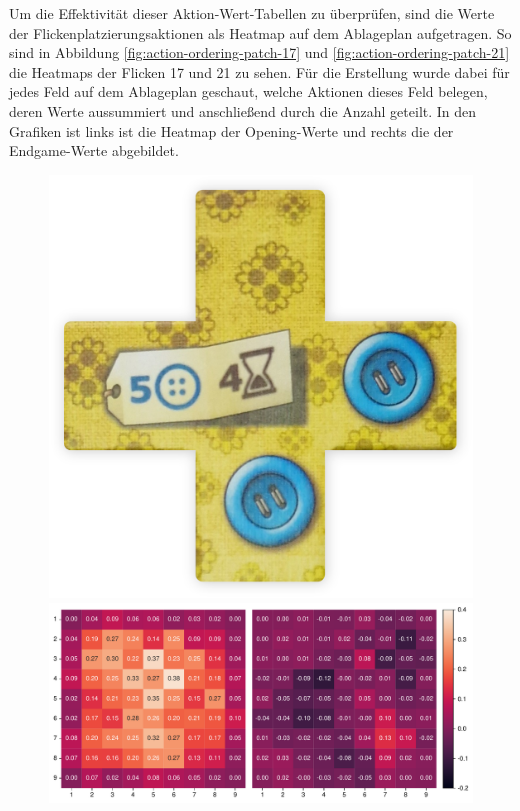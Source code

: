 \vspace*{-5cm}
\pagebreak

Um die Effektivität dieser Aktion-Wert-Tabellen zu überprüfen, sind die Werte der Flickenplatzierungsaktionen als Heatmap auf dem Ablageplan aufgetragen. So sind in Abbildung \ref{fig:action-ordering-patch-17} und \ref{fig:action-ordering-patch-21} die Heatmaps der Flicken 17 und 21 zu sehen. Für die Erstellung wurde dabei für jedes Feld auf dem Ablageplan geschaut, welche Aktionen dieses Feld belegen, deren Werte aussummiert und anschließend durch die Anzahl geteilt. In den Grafiken ist links ist die Heatmap der Opening-Werte und rechts die der Endgame-Werte abgebildet.

\vspace*{-0.77cm}

\begin{figure}[!ht]
    \centering
    \begin{minipage}{.11\textwidth}
        \centering
        \includegraphics[width=\linewidth]{res/pictures/assets/17-front.png}
    \end{minipage}
    \begin{minipage}{.78\textwidth}
        \centering
        \includegraphics[width=\linewidth]{res/pictures/plots/17-action-ordering.pdf}

\end{minipage}
\end{figure}
